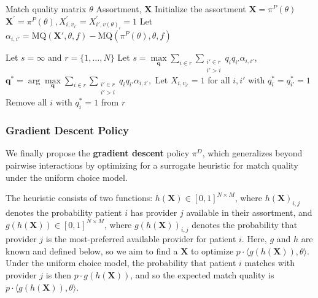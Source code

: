 \documentclass[11pt]{article}
\begin{document}
\begin{algorithm}[h]
   \caption{Group-based policy ($\pi^{G}$)}
\begin{algorithmic}[1]
     Match quality matrix $\theta$ 
     Assortment, $\mathbf{X}$
    \STATE Initialize the assortment $\mathbf{X} = \pi^{P}(\theta)$
        \STATE   $\mathbf{X}^{\prime} = \pi^{P}(\theta), {X}^{\prime}_{i,v_{i'}}= X^{\prime}_{i',v(\theta)_{i}}=1$ 
        \STATE Let $\alpha_{i,i'} = \mathrm{MQ}(\mathbf{X}',\theta,f) - \mathrm{MQ} (\pi^{P}(\theta),\theta,f)$ 
    \ENDFOR

    \STATE Let $s=\infty$ and $r=\{1,\ldots,N\}$
        \STATE Let $s = \max\limits_{\mathbf{q}} \sum_{i \in r} \sum_{\substack{i' \in r \\ i' > i}} q_{i} q_{i'} \alpha_{i,i'}$, $\mathbf{q}^* = \arg\max\limits_{\mathbf{q}} \sum_{i \in r} \sum_{\substack{i' \in r \\ i' > i}} q_i q_{i'} \alpha_{i,i'},$
        \STATE Let $X_{i,v_{i'}} = 1$ for all $i,i'$ with $q^*_{i} = q^*_{i'} = 1$ 
        \STATE Remove all $i$ with $q^*_{i} = 1$ from $r$
    \ENDWHILE
\end{algorithmic}
\label{alg:grouping}
\end{algorithm}

\subsubsection{Gradient Descent Policy}
\label{sec:lower_bound}
We finally propose the \textbf{gradient descent} policy $\pi^{D}$, which generalizes beyond pairwise interactions by optimizing for a surrogate heuristic for match quality under the uniform choice model. 

The heuristic consists of two functions: $h(\mathbf{X}) \in [0,1]^{N \times M}$, where $h(\mathbf{X})_{i,j}$ denotes the probability patient $i$ has provider $j$ available in their assortment, and $g(h(\mathbf{X})) \in [0,1]^{N \times M}$, where $g(h(\mathbf{X}))_{i,j}$ denotes the probability that provider $j$ is the most-preferred available provider for patient $i$. 
Here, $g$ and $h$ are known and defined below, so we aim to find a $\mathbf{X}$ to optimize $p \cdot \langle g(h(\mathbf{X})),\theta \rangle$. 
Under the uniform choice model, the probability that patient $i$ matches with provider $j$ is then $p \cdot g(h(\mathbf{X}))$, and so the expected match quality is $p \cdot \langle g(h(\mathbf{X})), \theta \rangle$. 
\end{document}
